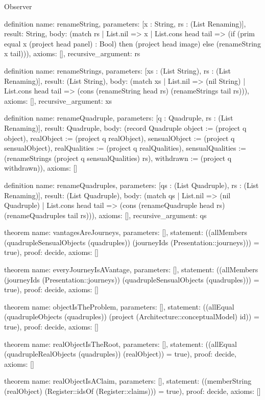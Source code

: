 \begin{lexlean}{Observer}
\begin{semanticmodule}
definition{
  name: renameString,
  parameters: [x : String, rs : (List Renaming)],
  result: String,
  body: (match rs
    | List.nil => x
    | List.cons head tail => (if (prim equal x (project head panel) : Bool) then (project head image) else (renameString x tail))),
  axioms: [],
  recursive_argument: rs
}

definition{
  name: renameStrings,
  parameters: [xs : (List String), rs : (List Renaming)],
  result: (List String),
  body: (match xs
    | List.nil => (nil String)
    | List.cons head tail => (cons (renameString head rs) (renameStrings tail rs))),
  axioms: [],
  recursive_argument: xs
}

definition{
  name: renameQuadruple,
  parameters: [q : Quadruple, rs : (List Renaming)],
  result: Quadruple,
  body: (record Quadruple {object := (project q object), realObject := (project q realObject), sensualObject := (project q sensualObject), realQualities := (project q realQualities), sensualQualities := (renameStrings (project q sensualQualities) rs), withdrawn := (project q withdrawn)}),
  axioms: []
}

definition{
  name: renameQuadruples,
  parameters: [qs : (List Quadruple), rs : (List Renaming)],
  result: (List Quadruple),
  body: (match qs
    | List.nil => (nil Quadruple)
    | List.cons head tail => (cons (renameQuadruple head rs) (renameQuadruples tail rs))),
  axioms: [],
  recursive_argument: qs
}

theorem{
  name: vantagesAreJourneys,
  parameters: [],
  statement: ((allMembers (quadrupleSensualObjects (quadruples)) (journeyIds (Presentation::journeys))) = true),
  proof: decide{},
  axioms: []
}

theorem{
  name: everyJourneyIsAVantage,
  parameters: [],
  statement: ((allMembers (journeyIds (Presentation::journeys)) (quadrupleSensualObjects (quadruples))) = true),
  proof: decide{},
  axioms: []
}

theorem{
  name: objectIsTheProblem,
  parameters: [],
  statement: ((allEqual (quadrupleObjects (quadruples)) (project (Architecture::conceptualModel) id)) = true),
  proof: decide{},
  axioms: []
}

theorem{
  name: realObjectIsTheRoot,
  parameters: [],
  statement: ((allEqual (quadrupleRealObjects (quadruples)) (realObject)) = true),
  proof: decide{},
  axioms: []
}

theorem{
  name: realObjectIsAClaim,
  parameters: [],
  statement: ((memberString (realObject) (Register::idsOf (Register::claims))) = true),
  proof: decide{},
  axioms: []
}


\end{semanticmodule}
\end{lexlean}
